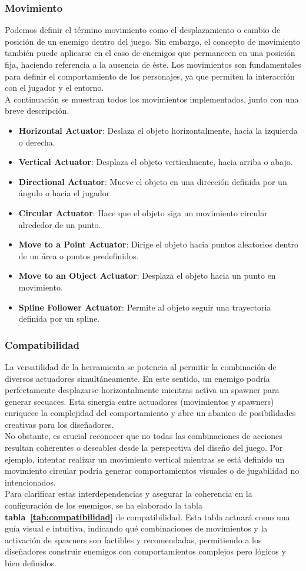 \subsubsection{Movimiento}
Podemos definir el término movimiento como el desplazamiento o cambio de posición de un enemigo dentro del juego. Sin embargo, el concepto de movimiento también puede aplicarse en el caso de enemigos que permanecen en una posición fija, haciendo referencia a la ausencia de éste. Los movimientos son fundamentales para definir el comportamiento de los personajes, ya que permiten la interacción con el jugador y el entorno.\\
A continuación se muestran todos los movimientos implementados, junto con una breve descripción.
\begin{itemize}
  \item \textbf{Horizontal Actuator}: Deslaza el objeto horizontalmente, hacia la izquierda o derecha.
    \item \textbf{Vertical Actuator}: Desplaza el objeto verticalmente, hacia arriba o abajo.
    \item \textbf{Directional Actuator}: Mueve el objeto en una dirección definida por un ángulo o hacia el jugador.
    \item \textbf{Circular Actuator}: Hace que el objeto siga un movimiento circular alrededor de un punto.
    \item \textbf{Move to a Point Actuator}: Dirige el objeto hacia puntos aleatorios dentro de un área o puntos predefinidos.
    \item \textbf{Move to an Object Actuator}: Desplaza el objeto hacia un punto en movimiento.
    \item \textbf{Spline Follower Actuator}: Permite al objeto seguir una trayectoria definida por un spline.
\end{itemize}
\subsubsection{Compatibilidad}
La versatilidad de la herramienta se potencia al permitir la combinación de diversos actuadores simultáneamente. En este sentido, un enemigo podría perfectamente desplazarse horizontalmente mientras activa un spawner para generar secuaces. Esta sinergia entre actuadores (movimientos y spawners) enriquece la complejidad del comportamiento y abre un abanico de posibilidades creativas para los diseñadores.\\
No obstante, es crucial reconocer que no todas las combinaciones de acciones resultan coherentes o deseables desde la perspectiva del diseño del juego. Por ejemplo, intentar realizar un movimiento vertical mientras se está definido un movimiento circular podría generar comportamientos visuales o de jugabilidad no intencionados. \\
Para clarificar estas interdependencias y asegurar la coherencia en la configuración de los enemigos, se ha elaborado la tabla \textbf{tabla~\ref{tab:compatibilidad}} de compatibilidad. Esta tabla actuará como una guía visual e intuitiva, indicando qué combinaciones de movimientos y la activación de spawners son factibles y recomendadas, permitiendo a los diseñadores construir enemigos con comportamientos complejos pero lógicos y bien definidos.

